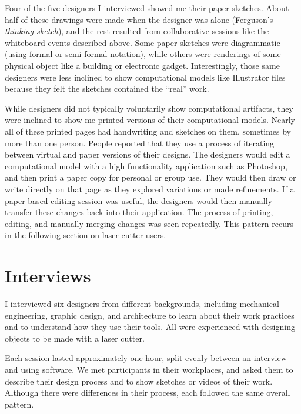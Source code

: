 Four of the five designers I interviewed showed me their paper
sketches. About half of these drawings were made when the designer was
alone (Ferguson's \textit{thinking sketch}), and the rest resulted
from collaborative sessions like the whiteboard events described
above. Some paper sketches were diagrammatic (using formal or
semi-formal notation), while others were renderings of some physical
object like a building or electronic gadget. Interestingly, those same
designers were less inclined to show computational models like
Illustrator files because they felt the sketches contained the
``real'' work.

While designers did not typically voluntarily show computational
artifacts, they were inclined to show me printed versions of their
computational models. Nearly all of these printed pages had
handwriting and sketches on them, sometimes by more than one
person. People reported that they use a process of iterating between
virtual and paper versions of their designs. The designers would edit
a computational model with a high functionality application such as
Photoshop, and then print a paper copy for personal or group use. They
would then draw or write directly on that page as they explored
variations or made refinements. If a paper-based editing session was
useful, the designers would then manually transfer these changes back
into their application. The process of printing, editing, and manually
merging changes was seen repeatedly. This pattern recurs in the
following section on laser cutter users.

\section{Interviews}
\label{sec:formative-interviews}



I interviewed six designers from different backgrounds, including
mechanical engineering, graphic design, and architecture to learn
about their work practices and to understand how they use their
tools. All were experienced with designing objects to be made with a
laser cutter.

Each session lasted approximately one hour, split evenly between an
interview and using software. We met participants in their workplaces,
and asked them to describe their design process and to show sketches
or videos of their work. Although there were differences in their
process, each followed the same overall pattern.

